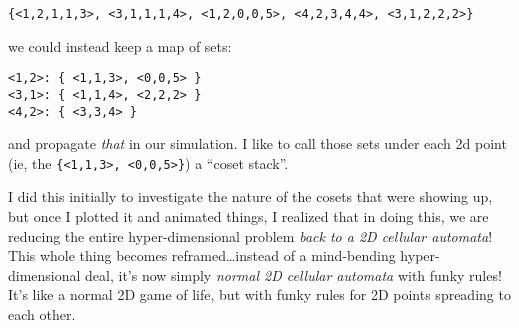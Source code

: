 \documentclass[]{article}
\begin{document}
\begin{verbatim}
{<1,2,1,1,3>, <3,1,1,1,4>, <1,2,0,0,5>, <4,2,3,4,4>, <3,1,2,2,2>}
\end{verbatim}

we could instead keep a map of sets:

\begin{verbatim}
<1,2>: { <1,1,3>, <0,0,5> }
<3,1>: { <1,1,4>, <2,2,2> }
<4,2>: { <3,3,4> }
\end{verbatim}

and propagate \emph{that} in our simulation. I like to call those sets under
each 2d point (ie, the
\texttt{\{\textless{}1,1,3\textgreater{},\ \textless{}0,0,5\textgreater{}\}}) a
``coset stack''.

I did this initially to investigate the nature of the cosets that were showing
up, but once I plotted it and animated things, I realized that in doing this, we
are reducing the entire hyper-dimensional problem \emph{back to a 2D cellular
automata}! This whole thing becomes reframed\ldots instead of a mind-bending
hyper-dimensional deal, it's now simply \emph{normal 2D cellular automata} with
funky rules! It's like a normal 2D game of life, but with funky rules for 2D
points spreading to each other.
\end{document}
